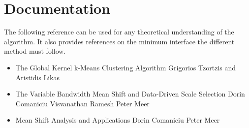\section*{Documentation}
The following reference can be used for any theoretical understanding of the algorithm. It also provides references on the minimum interface the different method must follow.

\begin{itemize}
\item The Global Kernel k-Means Clustering Algorithm
Grigorios Tzortzis and Aristidis Likas
\item The Variable Bandwidth Mean Shift and Data-Driven Scale Selection
Dorin Comaniciu
Visvanathan Ramesh 
Peter Meer
\item Mean Shift Analysis and Applications
Dorin Comaniciu
Peter Meer

\end{itemize}

